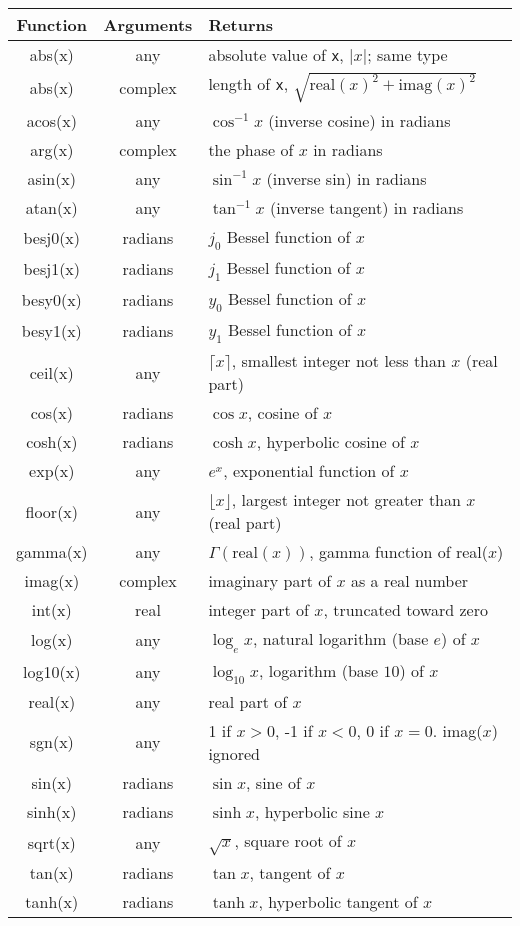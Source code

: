 \begin{center}
\begin{tabular}{|ccl|} \hline
Function & Arguments & Returns \\ \hline
abs(x) & any  &  absolute value of {\tt x}, $|x|$; same type \\
abs(x) & complex &  length of {\tt x}, $\sqrt{{\mbox{real}(x)^{2} +
\mbox{imag}(x)^{2}}}$ \\
acos(x) & any  & $\cos^{-1} x$ (inverse cosine) in radians \\
arg(x) & complex & the phase of $x$ in radians\\
asin(x) & any  & $\sin^{-1} x$ (inverse sin) in radians \\
atan(x) & any  & $\tan^{-1} x$ (inverse tangent) in radians \\
besj0(x) & radians &  $j_{0}$ Bessel function of $x$ \\
besj1(x) & radians & $j_{1}$ Bessel function of $x$ \\
besy0(x) & radians & $y_{0}$ Bessel function of $x$ \\
besy1(x) & radians & $y_{1}$ Bessel function of $x$ \\
ceil(x) & any & $\lceil x \rceil$, smallest integer not less than $x$
(real part) \\
cos(x) & radians & $\cos x$, cosine of $x$ \\
cosh(x) & radians & $\cosh x$, hyperbolic cosine of $x$ \\
exp(x) & any & $e^{x}$,  exponential function of $x$ \\
floor(x) & any & $\lfloor x \rfloor$,  largest integer not greater
than $x$ (real part) \\
gamma(x) & any & $\Gamma(\mbox{real}(x))$,  gamma function of real($x$) \\
imag(x) & complex &  imaginary part of $x$ as a real number \\
int(x) & real &  integer part of $x$, truncated toward zero \\
log(x) & any & $\log_{e} x$,  natural logarithm (base $e$) of $x$ \\
log10(x) & any & $\log_{10} x$,  logarithm (base $10$) of $x$ \\
real(x) & any &  real part of $x$ \\
sgn(x) & any & 1 if $x>0$, -1 if $x<0$, 0 if $x=0$. imag($x$) ignored \\
sin(x) & radians & $\sin x$, sine of $x$ \\
sinh(x) & radians & $\sinh x$, hyperbolic sine $x$ \\
sqrt(x) & any & $\sqrt{x}$,  square root of $x$ \\
tan(x) & radians & $\tan x$,  tangent of $x$ \\
tanh(x) & radians & $\tanh x$, hyperbolic tangent of $x$\\
\hline
\end{tabular}
\end{center}
